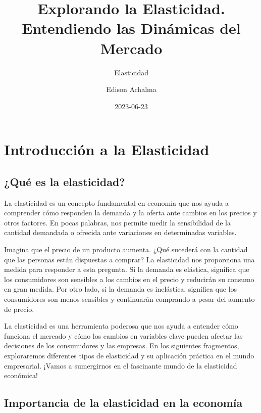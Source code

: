 \documentclass[
  a4paper,
]{article}
\title{Explorando la Elasticidad. Entendiendo las Dinámicas del Mercado}
\subtitle{Elasticidad}
\author{Edison Achalma}
\date{2023-06-23}
\begin{document}
\maketitle
\ifdefined\Shaded\renewenvironment{Shaded}{\begin{tcolorbox}[breakable, interior hidden, boxrule=0pt, borderline west={3pt}{0pt}{shadecolor}, enhanced, sharp corners, frame hidden]}{\end{tcolorbox}}\fi

\hypertarget{introducciuxf3n-a-la-elasticidad}{%
\section{Introducción a la
Elasticidad}\label{introducciuxf3n-a-la-elasticidad}}

\hypertarget{quuxe9-es-la-elasticidad}{%
\subsection{¿Qué es la elasticidad?}\label{quuxe9-es-la-elasticidad}}

La elasticidad es un concepto fundamental en economía que nos ayuda a
comprender cómo responden la demanda y la oferta ante cambios en los
precios y otros factores. En pocas palabras, nos permite medir la
sensibilidad de la cantidad demandada o ofrecida ante variaciones en
determinadas variables.

Imagina que el precio de un producto aumenta. ¿Qué sucederá con la
cantidad que las personas están dispuestas a comprar? La elasticidad nos
proporciona una medida para responder a esta pregunta. Si la demanda es
elástica, significa que los consumidores son sensibles a los cambios en
el precio y reducirán su consumo en gran medida. Por otro lado, si la
demanda es inelástica, significa que los consumidores son menos
sensibles y continuarán comprando a pesar del aumento de precio.

La elasticidad es una herramienta poderosa que nos ayuda a entender cómo
funciona el mercado y cómo los cambios en variables clave pueden afectar
las decisiones de los consumidores y las empresas. En los siguientes
fragmentos, exploraremos diferentes tipos de elasticidad y su aplicación
práctica en el mundo empresarial. ¡Vamos a sumergirnos en el fascinante
mundo de la elasticidad económica!

\hypertarget{importancia-de-la-elasticidad-en-la-economuxeda}{%
\subsection{Importancia de la elasticidad en la
economía}\label{importancia-de-la-elasticidad-en-la-economuxeda}}
\end{document}
